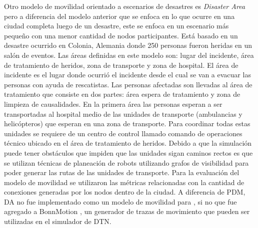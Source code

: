 Otro modelo de movilidad orientado a escenarios de desastres es \textit{Disaster
Area} \cite{aschenbruck_modeling_2009} pero a diferencia del modelo anterior que
se enfoca en lo que ocurre en una ciudad completa luego de un desastre, este se
enfoca en un escenario más pequeño con una menor cantidad de nodos
participantes. Está basado en un desastre ocurrido en Colonia, Alemania donde
250 personas fueron heridas en un salón de eventos. Las áreas definidas en este
modelo son: lugar del incidente, área de tratamiento de heridos, zona de
transporte y zona de hospital. El área de incidente es el lugar donde ocurrió el
incidente desde el cual se van a evacuar las personas con ayuda de rescatistas.
Las personas afectadas son llevadas al área de tratamiento que consiste en dos
partes: área espera de tratamiento y zona de limpieza de causalidades. En la
primera área las personas esperan a ser transportadas al hospital medio de las
unidades de transporte (ambulancias y helicópteros) que esperan en una zona de
transporte. Para coordinar todas estas unidades se requiere de un centro de
control llamado comando de operaciones técnico ubicado en el área de tratamiento
de heridos. Debido a que la simulación puede tener obstáculos que impiden que
las unidades sigan caminos rectos es que se utilizan técnicas de planeación de
robots utilizando grafos de visibilidad para poder generar las rutas de las
unidades de transporte. Para la evaluación del modelo de movilidad se utilizaron
las métricas relacionadas con la cantidad de conexiones generadas por los nodos
dentro de la ciudad. A diferencia de PDM, DA no fue implementado como un modelo
de movilidad para \theone, si no que fue agregado a BonnMotion
\cite{DBLP:conf/simutools/AschenbruckEGS10}, un generador de trazas de
movimiento que pueden ser utilizadas en el simulador de DTN.


